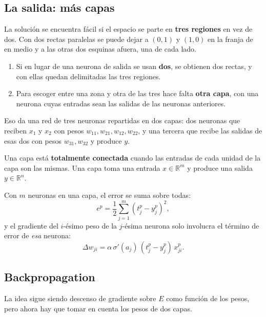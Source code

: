 \documentclass[11pt,letterpaper]{article}
\begin{document}
\subsection*{La salida: más capas}

La solución se encuentra fácil si el espacio se parte en
\textbf{tres regiones} en vez de dos. Con dos rectas paralelas se
puede dejar a $(0,1)$ y $(1,0)$ en la franja de en medio y a las
otras dos esquinas afuera, una de cada lado.

\begin{enumerate}[itemsep=0.25em]
  \item Si en lugar de una neurona de salida se usan \textbf{dos},
        se obtienen dos rectas, y con ellas quedan delimitadas las
        tres regiones.
  \item Para escoger entre una zona y otra de las tres hace falta
        \textbf{otra capa}, con una neurona cuyas entradas sean las
        salidas de las neuronas anteriores.
\end{enumerate}

Eso da una red de tres neuronas repartidas en dos capas: dos
neuronas que reciben $x_1$ y $x_2$ con pesos $w_{11}, w_{21}, w_{12},
w_{22}$, y una tercera que recibe las salidas de esas dos con pesos
$w_{31}, w_{32}$ y produce $y$.

\begin{definicion}
  Una capa está \textbf{totalmente conectada} cuando las entradas de
  cada unidad de la capa son las mismas. Una capa toma una entrada
  $x \in \mathbb{R}^m$ y produce una salida $y \in \mathbb{R}^n$.
\end{definicion}

Con $m$ neuronas en una capa, el error se suma sobre todas:
\[
    e^p = \frac{1}{2} \sum_{j=1}^{m} (t_j^p - y_j^p)^2 ,
\]
y el gradiente del $i$-ésimo peso de la $j$-ésima neurona solo
involucra el término de error de \emph{esa} neurona:
\[
    \Delta w_{ji} = \alpha\,\sigma'(a_j)\,(t_j^p - y_j^p)\,x_{ji}^p .
\]


\subsection*{Backpropagation}

La idea sigue siendo descenso de gradiente sobre $E$ como función de
los pesos, pero ahora hay que tomar en cuenta los pesos de dos capas.
\end{document}
